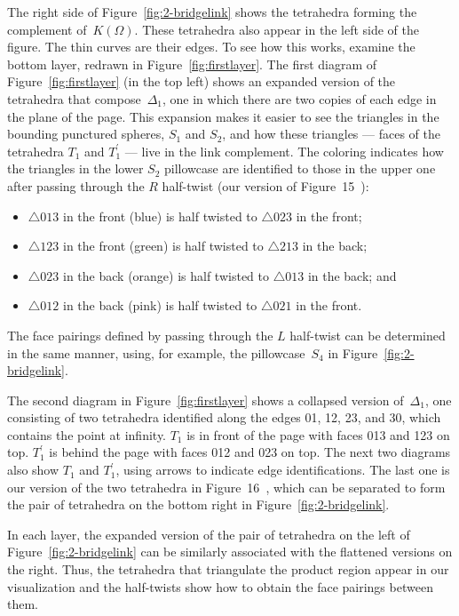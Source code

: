 \documentclass[reqno]{amsart}
\theoremstyle{plain}
\theoremstyle{definition}
\begin{document}
The right side of Figure~\ref{fig:2-bridgelink} shows the tetrahedra forming the complement of~$K(\Omega)$.  These tetrahedra also appear in the left side of the figure.  The thin curves are their edges.  To see how this works,  examine the bottom layer, redrawn in Figure~\ref{fig:firstlayer}.  The first diagram of Figure~\ref{fig:firstlayer} (in the top left) shows an expanded version of the tetrahedra that compose~$\Delta_1$, one in which there are two copies of each edge in the plane of the page.  This expansion makes it easier to see the triangles in the bounding punctured spheres, $S_1$ and $S_2$, and how these triangles --- faces of the tetrahedra $T_1$ and $T_1^\prime$ --- live in the link complement.  The coloring indicates how the triangles in the lower $S_2$ pillowcase are identified to those in the upper one after passing through the $R$ half-twist (our version of Figure~15~\cite[Appendix]{GwithF2Bridge}):
\begin{itemize}
\item $\triangle 013$ in the front (blue) is half twisted to $\triangle 023$ in the front;
\item $\triangle 123$ in the front (green) is half twisted to $\triangle 213$ in the back;
\item $\triangle 023$ in the back (orange) is half twisted to $\triangle 013$ in the back; and
\item $\triangle 012$ in the back (pink) is half twisted to $\triangle 021$ in the front.
\end{itemize}
The face pairings defined by passing through the $L$ half-twist can be determined in the same manner, using, for example, the pillowcase~$S_4$ in Figure~\ref{fig:2-bridgelink}.

The second diagram in Figure~\ref{fig:firstlayer} shows a collapsed version of~$\Delta_1$, one consisting of two tetrahedra identified along the edges 01, 12, 23, and 30, which contains the point at infinity.  $T_1$ is in front of the page with faces 013 and 123 on top.  $T_1^\prime$ is behind the page with faces 012 and 023 on top.  The next two  diagrams also show $T_1$ and $T_1^\prime$, using arrows to indicate edge identifications.  The last one is our version of the two tetrahedra in Figure~16~\cite[Appendix]{GwithF2Bridge}, which can be separated to form the pair of tetrahedra on the bottom right in Figure~\ref{fig:2-bridgelink}.  

In each layer, the expanded version of the pair of tetrahedra on the left of Figure~\ref{fig:2-bridgelink} can be similarly associated with the flattened versions  on the right.  Thus, the tetrahedra that triangulate the product region appear in our visualization and the half-twists show how to obtain the face pairings between them.
  
\end{document}
